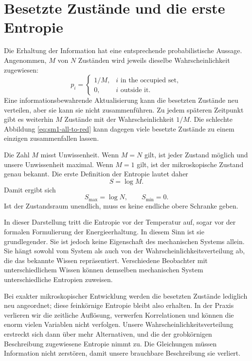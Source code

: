 \section{Besetzte Zustände und die erste Entropie}

Die Erhaltung der Information hat eine entsprechende probabilistische Aussage. Angenommen, \(M\) von \(N\) Zuständen wird jeweils dieselbe Wahrscheinlichkeit zugewiesen:
\begin{equation}
 p_i=
 \begin{cases}
 1/M, & i\text{ in the occupied set},\\
 0, & i\text{ outside it}.
 \end{cases}
 \label{eq:sm1-uniform-occupied}
\end{equation}
Eine informationsbewahrende Aktualisierung kann die besetzten Zustände neu verteilen, aber sie kann sie nicht zusammenführen. Zu jedem späteren Zeitpunkt gibt es weiterhin \(M\) Zustände mit der Wahrscheinlichkeit \(1/M\). Die schlechte Abbildung \eqref{eq:sm1-all-to-red} kann dagegen viele besetzte Zustände zu einem einzigen zusammenfallen lassen.

Die Zahl \(M\) misst Unwissenheit. Wenn \(M=N\) gilt, ist jeder Zustand möglich und unsere Unwissenheit maximal. Wenn \(M=1\) gilt, ist der mikroskopische Zustand genau bekannt. Die erste Definition der Entropie lautet daher
\begin{equation}
 S=\log M.
 \label{eq:sm1-entropy-logm}
\end{equation}
Damit ergibt sich
\begin{equation}
 S_{\max}=\log N,
 \qquad
 S_{\min}=0.
\end{equation}
Ist der Zustandsraum unendlich, muss es keine endliche obere Schranke geben.

In dieser Darstellung tritt die Entropie vor der Temperatur auf, sogar vor der formalen Formulierung der Energieerhaltung. In diesem Sinn ist sie grundlegender. Sie ist jedoch keine Eigenschaft des mechanischen Systems allein. Sie hängt sowohl vom System als auch von der Wahrscheinlichkeitsverteilung ab, die das bekannte Wissen repräsentiert. Verschiedene Beobachter mit unterschiedlichem Wissen können demselben mechanischen System unterschiedliche Entropien zuweisen.

Bei exakter mikroskopischer Entwicklung werden die besetzten Zustände lediglich neu angeordnet; diese feinkörnige Entropie bleibt also erhalten. In der Praxis verlieren wir die zeitliche Auflösung, verwerfen Korrelationen und können die enorm vielen Variablen nicht verfolgen. Unsere Wahrscheinlichkeitsverteilung erstreckt sich dann über mehr Alternativen, und die der grobkörnigen Beschreibung zugewiesene Entropie nimmt zu. Die Gleichungen müssen Information nicht zerstören, damit unsere brauchbare Beschreibung sie verliert.

